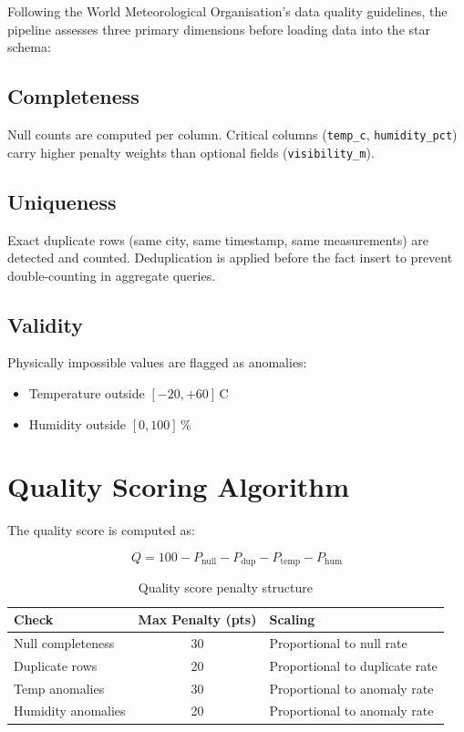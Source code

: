 \documentclass[12pt,a4paper]{report}
\begin{document}
Following the World Meteorological Organisation's data quality guidelines, the pipeline assesses three primary dimensions before loading data into the star schema:

\subsection{Completeness}
Null counts are computed per column. Critical columns (\texttt{temp\_c}, \texttt{humidity\_pct}) carry higher penalty weights than optional fields (\texttt{visibility\_m}).

\subsection{Uniqueness}
Exact duplicate rows (same city, same timestamp, same measurements) are detected and counted. Deduplication is applied before the fact insert to prevent double-counting in aggregate queries.

\subsection{Validity}
Physically impossible values are flagged as anomalies:
\begin{itemize}
  \item Temperature outside $[-20, +60]$\,\textdegree C
  \item Humidity outside $[0, 100]$\,\%
\end{itemize}

\section{Quality Scoring Algorithm}

The quality score is computed as:

\begin{equation}
  Q = 100 - P_{\text{null}} - P_{\text{dup}} - P_{\text{temp}} - P_{\text{hum}}
  \label{eq:qscore}
\end{equation}

\begin{table}[H]
  \centering
  \caption{Quality score penalty structure}
  \label{tab:penalties}
  \begin{tabular}{l c p{5cm}}
    \toprule
    \textbf{Check} & \textbf{Max Penalty (pts)} & \textbf{Scaling} \\
    \midrule
    Null completeness & 30 & Proportional to null rate \\
    Duplicate rows    & 20 & Proportional to duplicate rate \\
    Temp anomalies    & 30 & Proportional to anomaly rate \\
    Humidity anomalies & 20 & Proportional to anomaly rate \\
    \bottomrule
  \end{tabular}
\end{table}
\end{document}
